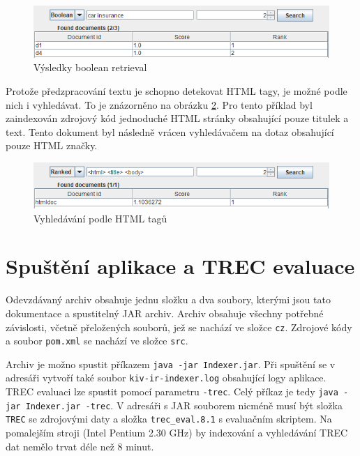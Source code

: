 \documentclass[11pt,a4paper]{scrartcl}
\begin{document}
	\begin{figure}[h]
		\centering
		\includegraphics[width=\linewidth]{gui-boolean-res}
		\caption{Výsledky boolean retrieval}
		\label{fig:boolean}
	\end{figure}
	
	Protože předzpracování textu je schopno detekovat HTML tagy, je možné podle nich i vyhledávat. To je znázorněno na obrázku \ref{fig:html-search}. Pro tento příklad byl zaindexován zdrojový kód jednoduché HTML stránky obsahující pouze titulek a text. Tento dokument byl následně vrácen vyhledávačem na dotaz obsahující pouze HTML značky.
	
	\begin{figure}[h]
		\centering
		\includegraphics[width=\linewidth]{gui-html-search}
		\caption{Vyhledávání podle HTML tagů}
		\label{fig:html-search}
	\end{figure}
	
	\section{Spuštění aplikace a TREC evaluace}
	
	Odevzdávaný archiv obsahuje jednu složku a dva soubory, kterými jsou tato dokumentace a spustitelný JAR archiv. Archiv obsahuje všechny potřebné závislosti, včetně přeložených souborů, jež se nachází ve složce \verb|cz|. Zdrojové kódy a soubor \verb|pom.xml| se nachází ve složce \verb|src|.
	
	Archiv je možno spustit příkazem \verb|java -jar Indexer.jar|. Při spuštění se v adresáři vytvoří také soubor \verb|kiv-ir-indexer.log| obsahující logy aplikace. TREC evaluaci lze spustit pomocí parametru \verb|-trec|. Celý příkaz je tedy \verb|java -jar Indexer.jar -trec|. V adresáři s JAR souborem nicméně musí být složka \verb|TREC| se zdrojovými daty a složka \verb|trec_eval.8.1| s evaluačním skriptem. Na pomalejším stroji (Intel Pentium 2.30 GHz) by indexování a vyhledávání TREC dat nemělo trvat déle než 8 minut.
	
\end{document}
